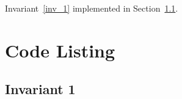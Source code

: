 
Invariant~\ref{inv_1} implemented in Section~\ref{code_1}.

\section{Code Listing}
\subsection{Invariant 1}
\label{code_1}

